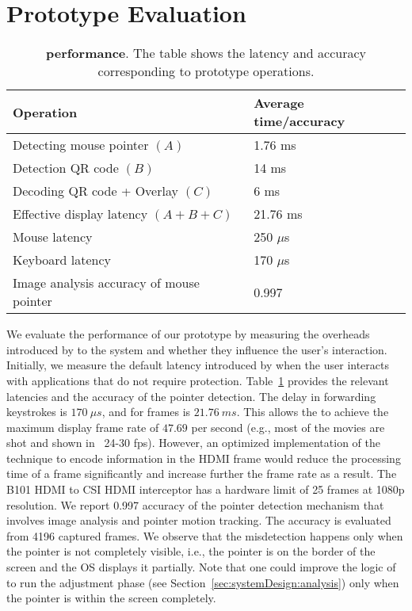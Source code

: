 \section{Prototype Evaluation}
\label{sec:eval_protection}



\begin{table}[t]
\small
\centering
\begin{tabular}{ll}
\textbf{Operation} & \textbf{Average time/accuracy} \\\toprule
Detecting mouse pointer $(A)$ & 1.76 ms \\
Detection QR code $(B)$ & 14 ms\\
Decoding QR code + Overlay $(C)$ & 6 ms\\
Effective display latency $(A+B+C)$ & 21.76 ms \\
Mouse latency & 250 $\mu$s\\
Keyboard latency & 170 $\mu$s\\\midrule
Image analysis accuracy of mouse pointer & 0.997 \\\bottomrule
\end{tabular} 
\caption[\device performance]{\textbf{\device performance}. The table shows the latency and accuracy corresponding to \name prototype operations.}
\label{tab:performance}
\end{table}

We evaluate the performance of our prototype by measuring the overheads introduced by \name to the system and whether they influence the user's interaction. Initially, we measure the default latency introduced by \device when the user interacts with applications that do not require protection. Table~\ref{tab:performance} provides the relevant latencies and the accuracy of the pointer detection.
The delay in forwarding keystrokes is $170\ \mu s$, and for frames is $21.76\ ms$. This allows the \device to achieve the maximum display frame rate of $47.69$ per second (e.g., most of the movies are shot and shown in  ~24-30 fps). However, an optimized implementation of the technique to encode information in the HDMI frame would reduce the processing time of a frame significantly and increase further the frame rate as a result. The B101 HDMI to CSI HDMI interceptor has a hardware limit of 25 frames at 1080p resolution. We report 0.997 accuracy of the pointer detection mechanism that involves image analysis and pointer motion tracking. The accuracy is evaluated from 4196 captured frames.
We observe that the misdetection happens only when the pointer is not completely visible, i.e., the pointer is on the border of the screen and the OS displays it partially. Note that one could improve the logic of \device to run the adjustment phase (see Section~\ref{sec:systemDesign:analysis}) only when the pointer is within the screen completely.

